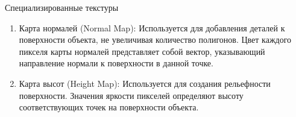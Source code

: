 \documentclass{beamer}
\begin{document}
	\begin{frame}{Специализированные текстуры}
		\begin{enumerate}
			\item Карта нормалей (Normal Map): Используется для добавления деталей к поверхности объекта, не увеличивая количество полигонов. Цвет каждого пикселя карты нормалей представляет собой вектор, указывающий направление нормали к поверхности в данной точке.
			\item Карта высот (Height Map): Используется для создания рельефности поверхности. Значения яркости пикселей определяют высоту соответствующих точек на поверхности объекта.
	
		\end{enumerate}


		
	\end{frame}
\end{document}
